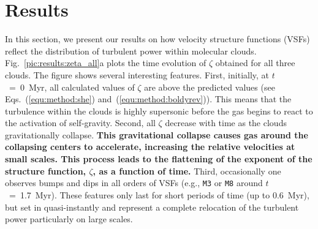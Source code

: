 \section{Results}\label{results}

In this section, we present our results on how velocity structure functions (VSFs) reflect the distribution of turbulent power within molecular clouds.
Fig.~\ref{pic:results:zeta_all}a plots the time evolution of $\zeta$ obtained for all three clouds.
The figure shows several interesting features.
First, initially, at $t$~=~0~Myr, all calculated values of $\zeta$ are above the predicted values (see Eqs.~(\ref{equ:method:she}) and~(\ref{equ:method:boldyrev})).
This means that the turbulence within the clouds is highly supersonic before the gas begins to react to the activation of self-gravity.
Second, all $\zeta$ decrease with time as the clouds gravitationally collapse.
\textbf{This gravitational collapse causes gas around the collapsing centers to accelerate, increasing the relative velocities at small scales. This process leads to the flattening of the exponent of the structure function, $\zeta$, as a function of time. }
Third, occasionally one observes bumps and dips in all orders of VSFs (e.g., \texttt{M3} or \texttt{M8} around $t$~=~1.7~Myr). 
These features only last for short periods of time (up to 0.6~Myr), but set in quasi-instantly and represent a complete relocation of the turbulent power particularly on large scales. 


